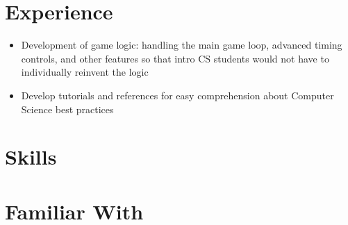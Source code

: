 \documentclass{my_cv}
\begin{document}
\section{Experience}
\begin{itemize}
\item Development of game logic: handling the main game loop, advanced timing controls, and other features so that intro CS students would not have to individually reinvent the logic
\end{itemize}
\begin{itemize}
\item Develop tutorials and references for easy comprehension about Computer Science best practices
\end{itemize}

\section{Skills}
\cvlistitem{\LaTeX}

\section{Familiar With}

\end{document}
